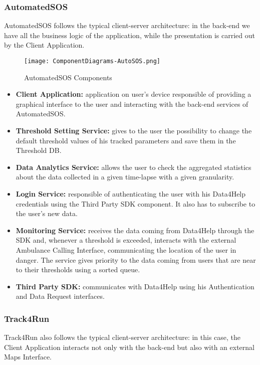 \subsubsection{AutomatedSOS}
AutomatedSOS follows the typical client-server architecture: in the back-end we have all the business logic of the application, while the presentation is carried out by the Client Application.

\FloatBarrier
\begin{figure}[!h]
	\centering
	\texttt{[image: ComponentDiagrams-AutoSOS.png]}
	\caption{AutomatedSOS Components}
\end{figure}
\FloatBarrier

\begin{itemize}
	\item \textbf{Client Application:} application on user's device responsible of providing a graphical interface to the user and interacting with the back-end  services of AutomatedSOS.
	\item \textbf{Threshold Setting Service:} gives to the user the possibility to change the default threshold values of his tracked parameters and save them in the Threshold DB. 
	\item \textbf{Data Analytics Service:} allows the user to check the aggregated statistics about the data collected in a given time-lapse with a given granularity. 
	\item \textbf{Login Service:} responsible of authenticating the user with his Data4Help credentials using the Third Party SDK component. It also has to subscribe to the user's new data.
	\item \textbf{Monitoring Service:} receives the data coming from Data4Help through the SDK and, whenever a threshold is exceeded, interacts with the external Ambulance Calling Interface, communicating the location of the user in danger. The service gives priority to the data coming from users that are near to their thresholds using a sorted queue.
	\item \textbf{Third Party SDK:} communicates with Data4Help using his Authentication and Data Request interfaces.
\end{itemize}

\subsubsection{Track4Run}
Track4Run also follows the typical client-server architecture: in this case, the Client Application interacts not only with the back-end but also with an external Maps Interface.

